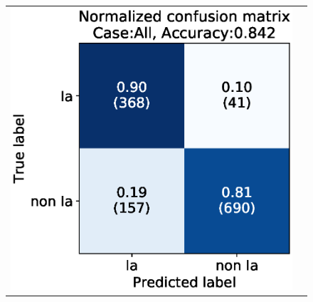 \documentclass[proof]{pasj01}
\begin{document}
%
%
%
%
%
%
\begin{figure}[htbp]
    \begin{tabular}{cc}
        \begin{minipage}{0.5\hsize}
            \begin{center}
                \includegraphics[width=\columnwidth]{figures/10_CM_absolute-magnitude-scaled-flux-remove-y_SNdata_test_190522_2_Flagall_all.eps}
            \end{center}
        \end{minipage}
        \begin{minipage}{0.5\hsize}
            \begin{center}

\end{center}
\end{minipage}
\end{tabular}
\end{figure}
\end{document}
